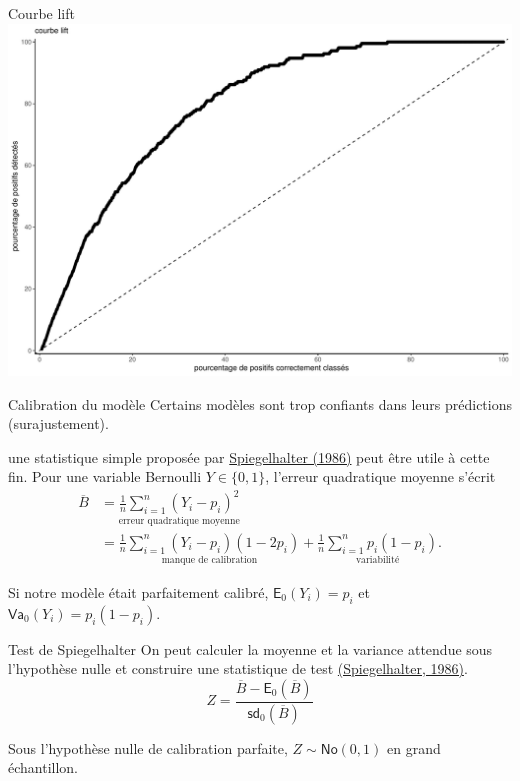 \documentclass[
  ignorenonframetext,
]{beamer}
\begin{document}
\begin{frame}{Courbe lift}
\protect\hypertarget{courbe-lift-1}{}
\includegraphics{MATH60602-diapos6_files/figure-beamer/figcourbe-lift-pr-1.pdf}
\end{frame}

\begin{frame}{Calibration du modèle}
\protect\hypertarget{calibration-du-moduxe8le}{}
Certains modèles sont trop confiants dans leurs prédictions
(surajustement).

une statistique simple proposée par
\href{https://doi.org/10.1002/sim.4780050506}{Spiegelhalter (1986)} peut
être utile à cette fin. Pour une variable Bernoulli \(Y \in \{0,1\}\),
l'erreur quadratique moyenne s'écrit \begin{align*}
\overline{B} &= \underset{\text{erreur quadratique moyenne}}{\frac{1}{n} \sum_{i=1}^n (Y_i-p_i)^2}
\\&=\underset{\text{manque de calibration}}{\frac{1}{n} \sum_{i=1}^n(Y_i-p_i)(1-2p_i)} + \underset{\text{variabilité}}{\frac{1}{n} \sum_{i=1}^n p_i(1-p_i)}.
\end{align*}

Si notre modèle était parfaitement calibré, \(\mathsf{E}_0(Y_i)=p_i\) et
\(\mathsf{Va}_0(Y_i) = p_i(1-p_i)\).
\end{frame}

\begin{frame}{Test de Spiegelhalter}
\protect\hypertarget{test-de-spiegelhalter}{}
On peut calculer la moyenne et la variance attendue sous l'hypothèse
nulle et construire une statistique de test
\href{https://doi.org/10.1002/sim.4780050506}{(Spiegelhalter, 1986)}.
\[Z = \frac{\overline{B} -\mathsf{E}_0(\overline{B})}{\mathsf{sd}_0(\overline{B})}\]

Sous l'hypothèse nulle de calibration parfaite,
\(Z \sim \mathsf{No}(0,1)\) en grand échantillon.
\end{frame}
\end{document}
